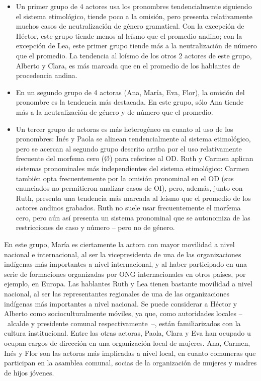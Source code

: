 \documentclass[output=paper]{../langscibook}
\begin{document}
\begin{itemize}
\item Un primer grupo de 4 actores usa los pronombres tendencialmente siguiendo el sistema etimológico, tiende poco a la omisión, pero presenta relativamente muchos casos de neutralización de género gramatical. Con la excepción de Héctor, este grupo tiende menos al leísmo que el promedio andino; con la excepción de Lea, este primer grupo tiende más a la neutralización de número que el promedio. La tendencia al loísmo de los otros 2 actores de este grupo, Alberto y Clara, es más marcada que en el promedio de los hablantes de procedencia andina.
\item En un segundo grupo de 4 actoras (Ana, María, Eva, Flor), la omisión del pronombre es la tendencia más destacada. En este grupo, sólo Ana tiende más a la neutralización de género y de número que el promedio.
\item Un tercer grupo de actoras es más heterogéneo en cuanto al uso de los pronombres: Inés y Paola se alinean tendencialmente al sistema etimológico, pero se acercan al segundo grupo descrito arriba por el uso relativamente frecuente del morfema cero (Ø) para referirse al OD. Ruth y Carmen aplican sistemas pronominales más independientes del sistema etimológico: Carmen también opta frecuentemente por la omisión pronominal en el OD (sus enunciados no permitieron analizar casos de OI), pero, además, junto con Ruth, presenta una tendencia más marcada al leísmo que el promedio de los actores andinos grabados. Ruth no suele usar frecuentemente el morfema cero, pero aún así presenta un sistema pronominal que se autonomiza de las restricciones de caso y número – pero no de género.
\end{itemize}

En este grupo, María es ciertamente la actora con mayor movilidad a nivel nacional e internacional, al ser la vicepresidenta de una de las organizaciones indígenas más importantes a nivel internacional, y al haber participado en una serie de formaciones organizadas por ONG internacionales en otros países, por ejemplo, en Europa. Las hablantes Ruth y Lea tienen bastante movilidad a nivel nacional, al ser las representantes regionales de una de las organizaciones indígenas más importantes a nivel nacional. Se puede considerar a Héctor y Alberto como socioculturalmente móviles, ya que, como autoridades locales – alcalde y presidente comunal respectivamente –, están familiarizados con la cultura institucional. Entre las otras actoras, Paola, Clara y Eva han ocupado u ocupan cargos de dirección en una organización local de mujeres. Ana, Carmen, Inés y Flor son las actoras más implicadas a nivel local, en cuanto comuneras que participan en la asamblea comunal, socias de la organización de mujeres y madres de hijos jóvenes.
\end{document}
